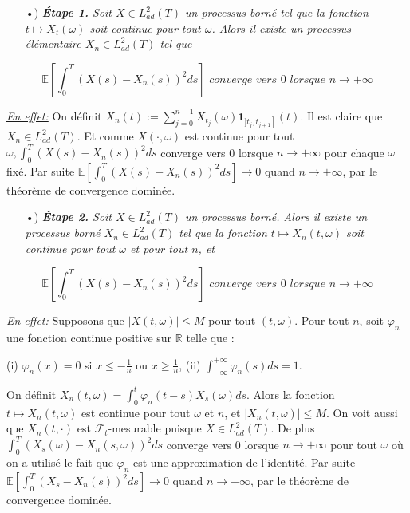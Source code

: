 \documentclass[A4paper,12pt]{report}
\newcommand{\E}{{\mathbb{E}}}
\begin{document}
\begin{itemize}
  \item[•)] \textit{\textbf{Étape 1.} Soit $X \in L_{a d}^{2}(T)$ un processus borné tel que la fonction $t \longmapsto  X_t(\omega)$ soit continue pour tout $\omega$. Alors il existe un processus élémentaire $X_{n} \in L_{a d}^{2}(T) $ tel que}
\end{itemize}
$$
\E \left[ \int_{0}^{T}\left(X(s)-X_{n}(s)\right)^{2} d s\right] \textit { converge vers } 0 \textit { lorsque } n \rightarrow+\infty
$$

\underline{\textit{En effet:}} On définit $X_{n}(t):=\sum_{j=0}^{n-1} X_{t_{j}}(\omega) \mathbf{1}_{\left.] t_{j}, t_{j+1}\right]}(t)$. Il est claire que $X_{n} \in L_{a d}^{2}(T)$. Et comme $X(\cdot, \omega)$ est continue pour tout $\omega, \int_{0}^{T}\left(X(s)-X_{n}(s)\right)^{2} d s$ converge vers 0 lorsque $n \rightarrow+\infty$ pour chaque $\omega$ fixé. Par suite $\E \left[\int_{0}^{T}\left(X(s)-X_{n}(s)\right)^{2} ds \right] \rightarrow 0$ quand $n \rightarrow+\infty$, par le théorème de convergence dominée.\\

\begin{itemize}
  \item[•)] \textit{\textbf{Étape 2.} Soit $X \in L_{a d}^{2}(T)$ un processus borné. Alors il existe un processus borné $X_{n} \in L_{a d}^{2}(T)$ tel que la fonction $t \longmapsto X_{n}(t, \omega)$ soit continue pour tout $\omega$ et pour tout $n$, et}
\end{itemize}

$$
\E\left[ \int_{0}^{T}\left(X(s)-X_{n}(s)\right)^{2} d s\right] \textit { converge vers } 0 \textit { lorsque } n \rightarrow+\infty
$$

\underline{\textit{En effet:}} Supposons que $|X(t, \omega)| \leq M$ pour tout $(t, \omega)$. Pour tout $n$, soit $\varphi_{n}$ une fonction continue positive sur $\mathbb{R}$ telle que :

(i) $\varphi_{n}(x)=0$ si $x \leq-\frac{1}{n}$ ou $x \geq \frac{1}{n}$, (ii) $\int_{-\infty}^{+\infty} \varphi_{n}(s) d s=1$.

On définit $X_{n}(t, \omega)=\int_{0}^{t} \varphi_{n}(t-s) X_s(\omega) d s$. Alors la fonction $t \longmapsto X_{n}(t, \omega)$ est continue pour tout $\omega$ et $n$, et $\left|X_{n}(t, \omega)\right| \leq M$. On voit aussi que $X_{n}(t, \cdot)$ est $\mathcal{F}_{t}$-mesurable puisque $X \in L_{a d}^{2}(T)$. De plus $\int_{0}^{T}\left(X_s(\omega)-X_{n}(s, \omega)\right)^{2} d s$ converge vers 0 lorsque $n \rightarrow+\infty$ pour tout $\omega$ où on a utilisé le fait que $\varphi_{n}$ est une approximation de l'identité. Par suite $\E\left[ \int_{0}^{T}\left(X_s -X_{n}(s)\right)^{2} d s\right] \rightarrow 0$ quand $n \rightarrow+\infty$, par le théorème de convergence dominée.\\
\end{document}
